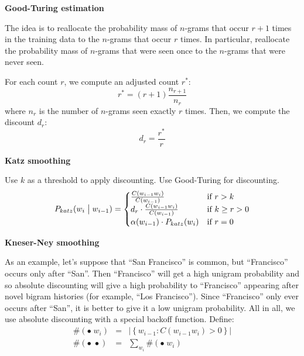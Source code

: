 \documentclass[11pt]{article}
\begin{document}
\vspace{20pt}
\textbf{Good-Turing estimation}
\vspace{10pt}

The idea is to reallocate the probability mass of $n$-grams that occur $r+1$ times in the training data to the $n$-grams that occur $r$ times. In particular, reallocate the probability mass of $n$-grams that were seen once to the $n$-grams that were never seen.

For each count $r$, we compute an adjusted count $r^\ast$:
\[
    r^\ast = (r+1)\frac{n_{r+1}}{n_r}
\]
where $n_r$ is the number of $n$-grams seen exactly $r$ times. Then, we compute the discount $d_r$:
\[
    d_r = \frac{r^\ast}{r}
\]

\vspace{20pt}
\textbf{Katz smoothing}
\vspace{10pt}

Use $k$ as a threshold to apply discounting. Use Good-Turing for discounting.
\begin{equation*}
    P_{katz}(w_i \bigm| w_{i-1}) = \begin{cases}
                                       \frac{C(w_{i-1}w_i)}{C(w_{i-1})} & \mbox{if } r > k \\
                                       d_r \cdot \frac{C(w_{i-1}w_i)}{C(w_{i-1})} & \mbox{if } k \geq r > 0 \\
                                       \alpha(w_{i-1}) \cdot P_{katz}(w_{i}) & \mbox{if } r = 0
                                   \end{cases}
\end{equation*}

\vspace{20pt}
\textbf{Kneser-Ney smoothing}
\vspace{10pt}

As an example, let's suppose that ``San Francisco'' is common, but ``Francisco'' occurs only after ``San''. Then ``Francisco'' will get a high unigram probability and so absolute discounting will give a high probability to ``Francisco'' appearing after novel bigram histories (for example, ``Los Francisco''). Since ``Francisco'' only ever occurs after ``San'', it is better to give it a low unigram probability. All in all, we use absolute discounting with a special backoff function. Define:
\begin{eqnarray*}
    \#(\bullet \; w_i) &=& \left|\left\{w_{i-1} : C(w_{i-1}w_i) > 0 \right\}\right| \\
    \#(\bullet \; \bullet) &=& \sum\limits_{w_i} \#(\bullet \; w_i)
\end{eqnarray*}
\end{document}
